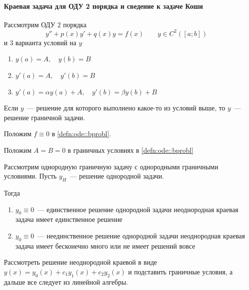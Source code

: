 \documentclass{trlnotes}
\begin{document}
\paragraph{Краевая задача для ОДУ 2 порядка и сведение к задаче Коши}
\label{par:ode::bprobl}
\begin{defn}\label{defn:ode::bprobl}
  Рассмотрим ОДУ 2 порядка
  \[
    y'' + p(x) y' + q(x) y = f(x) \qquad y \in C^2([a;b])
  \]
  и 3 варианта условий на $y$
  \begin{enumerate}[I]
    \item $y(a) = A, \quad y(b) = B$ \label{it:ode::bprobl::cond:i}
    \item $y'(a) = A, \quad y'(b) = B$ \label{it:ode::bprobl::cond::ii}
    \item $y'(a) = α y(a) + A, \quad y'(b) = βy(b) + B$ \label{it:ode::bprobl::cond::iii}
    \end{enumerate}
  
  Если $y$~--- решение для которого выполнено какое-то из условий выше, то $y$~--- решение
  граничной задачи.
\end{defn}

\begin{defn}\label{defn:ode::bprobl::hom}
  Положим $f \equiv 0$ в \ref{defn:ode::bprobl}.
\end{defn}
\begin{defn}\label{defn:ode::bprobl::hombnd}
  Положим $A = B = 0$ в граничных условиях в \ref{defn:ode::bprobl}
\end{defn}

\begin{thrm}[об альтернативе]\label{thrm:ode::bprobl::alt}
  Рассмотрим однородную граничную задачу с однородными граничными условиями.
  Пусть $y_H$~--- решение однородной задачи. 

  Тогда
  \begin{enumerate}
    \item $y_0 \equiv 0$~--- единственное решение однородной задачи \so неоднородная краевая 
      задача имеет единственное решение
    \item $y_0 \equiv 0$~--- неединственное решение однородной задачи \so неоднородная краевая 
      задача имеет бесконечно много или не имеет решений вовсе
  \end{enumerate}
\end{thrm}


\begin{prf}
  Рассмотреть решение неоднородной краевой в виде $y(x) = y_0(x) + c_1 y_1(x) + c_2 y_2(x)$
  и подставить граничные условия, а дальше все следует из линейной алгебры.
\end{prf}
\end{document}

